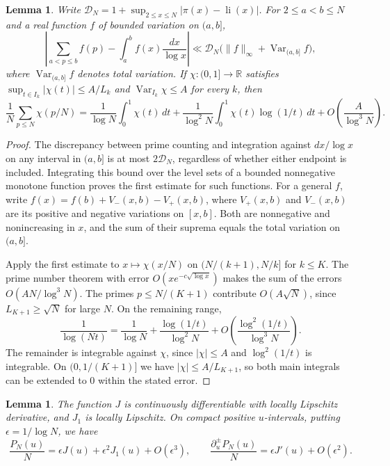\documentclass[11pt]{amsart}
\newtheorem{lemma}[theorem]{Lemma}
\theoremstyle{remark}
\DeclareMathOperator{\li}{li}
\begin{document}
\begin{lemma}
\label{lem:prime-summation}
Write \(\mathcal D_N=1+\sup_{2\le x\le N}|\pi(x)-\li(x)|\).
For \(2\le a<b\le N\) and a real function \(f\) of bounded variation on
\((a,b]\),
\[
 \left|\sum_{a<p\le b}f(p)-\int_a^b f(x)\frac{dx}{\log x}\right|
 \ll \mathcal D_N\bigl(\|f\|_\infty+\operatorname{Var}_{(a,b]} f\bigr),
\]
where \(\operatorname{Var}_{(a,b]} f\) denotes total variation.
If \(\chi:(0,1]\to\mathbb R\) satisfies
\(\sup_{t\in I_k}|\chi(t)|\le A/L_k\) and
\(\operatorname{Var}_{I_k}\chi\le A\) for every \(k\), then
\begin{equation}
 \frac1N\sum_{p\le N}\chi(p/N)
 =\frac{1}{\log N}\int_0^1\chi(t)\,dt
  +\frac{1}{\log^2 N}\int_0^1\chi(t)\log(1/t)\,dt
  +O\!\left(\frac{A}{\log^3 N}\right).
 \label{eq:general-prime-expansion}
\end{equation}
\end{lemma}

\begin{proof}
The discrepancy between prime counting and integration against
\(dx/\log x\) on any interval in \((a,b]\) is at most \(2\mathcal D_N\),
regardless of whether either endpoint is included. Integrating this
bound over the level sets of a bounded nonnegative monotone function
proves the first estimate for such functions. For a general \(f\),
write \(f(x)=f(b)+V_-(x,b)-V_+(x,b)\), where \(V_+(x,b)\) and
\(V_-(x,b)\) are its positive and negative variations on \([x,b]\).
Both are nonnegative and nonincreasing in \(x\), and the sum of their
suprema equals the total variation on \((a,b]\).

Apply the first estimate to \(x\mapsto\chi(x/N)\) on
\((N/(k+1),N/k]\) for \(k\le K\). The prime number theorem with error
\(O(xe^{-c\sqrt{\log x}})\) \cite[Section~6.2, (6.14)]{montgomery-vaughan}
makes the sum of the errors \(O(AN/\log^3 N)\).
The primes \(p\le N/(K+1)\) contribute \(O(A\sqrt N)\), since
\(L_{K+1}\ge\sqrt N\) for large \(N\). On the remaining range,
\[
 \frac{1}{\log(Nt)}
 =\frac{1}{\log N}+\frac{\log(1/t)}{\log^2 N}
  +O\!\left(\frac{\log^2(1/t)}{\log^3 N}\right).
\]
The remainder is integrable against \(\chi\), since
\(|\chi|\le A\) and \(\log^2(1/t)\) is integrable. On
\((0,1/(K+1)]\) we have \(|\chi|\le A/L_{K+1}\), so both main
integrals can be extended to \(0\) within the stated error.
\end{proof}

\begin{lemma}
\label{lem:prime-expansion}
The function \(J\) is continuously differentiable with locally Lipschitz derivative, and \(J_1\) is locally Lipschitz. On compact positive \(u\)-intervals, putting \(\epsilon=1/\log N\), we have
\begin{equation}
 \frac{P_N(u)}{N}=\epsilon J(u)+\epsilon^2 J_1(u)+O(\epsilon^3),
 \qquad
 \frac{\partial_u^\pm P_N(u)}{N}=\epsilon J'(u)+O(\epsilon^2).
 \label{eq:prime-expansion}
\end{equation}
\end{lemma}
\end{document}
